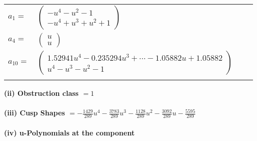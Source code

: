 \documentclass[1p]{elsarticle_modified}
\theoremstyle{definition}
\begin{document}
\begin{tabular}{m{7pt} m{180pt} m{7pt} m{180pt} }
\flushright $a_{1}=$&$\begin{pmatrix}- u^4- u^2-1\\- u^4+u^3+u^2+1\end{pmatrix}$ \\
\flushright $a_{4}=$&$\begin{pmatrix}u\\u\end{pmatrix}$ \\
\flushright $a_{10}=$&$\begin{pmatrix}1.52941 u^{4}-0.235294 u^{3}+\cdots-1.05882 u+1.05882\\u^4- u^3- u^2-1\end{pmatrix}$\\&\end{tabular}
\flushleft \textbf{(ii) Obstruction class $= 1$}\\~\\
\flushleft \textbf{(iii) Cusp Shapes $= -\frac{1429}{289} u^4-\frac{3783}{289} u^3-\frac{1128}{289} u^2-\frac{3092}{289} u-\frac{5595}{289}$}\\~\\
\newpage\renewcommand{\arraystretch}{1}
\flushleft \textbf{(iv) u-Polynomials at the component}\newline \\
\end{document}
